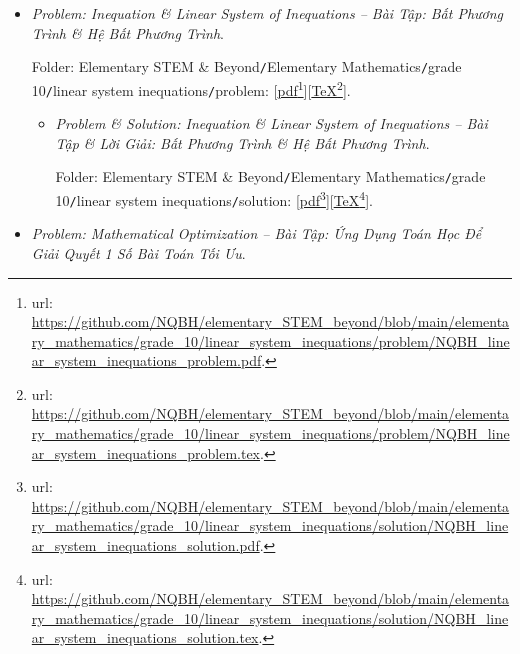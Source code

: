 \documentclass{article}
\begin{document}
\begin{itemize}
	\item {\it Problem: Inequation \& Linear System of Inequations -- Bài Tập: Bất Phương Trình \& Hệ Bất Phương Trình}.

	Folder: {\sf Elementary STEM \& Beyond{\tt/}Elementary Mathematics{\tt/}grade 10{\tt/}linear system inequations{\tt/}problem}: [\href{https://github.com/NQBH/elementary_STEM_beyond/blob/main/elementary_mathematics/grade_10/linear_system_inequations/problem/NQBH_linear_system_inequations_problem.pdf}{pdf}\footnote{{\sc url}: \url{https://github.com/NQBH/elementary_STEM_beyond/blob/main/elementary_mathematics/grade_10/linear_system_inequations/problem/NQBH_linear_system_inequations_problem.pdf}.}][\href{https://github.com/NQBH/elementary_STEM_beyond/blob/main/elementary_mathematics/grade_10/linear_system_inequations/problem/NQBH_linear_system_inequations_problem.tex}{\TeX}\footnote{{\sc url}: \url{https://github.com/NQBH/elementary_STEM_beyond/blob/main/elementary_mathematics/grade_10/linear_system_inequations/problem/NQBH_linear_system_inequations_problem.tex}.}].
	\begin{itemize}
		\item {\it Problem \& Solution: Inequation \& Linear System of Inequations -- Bài Tập \& Lời Giải: Bất Phương Trình \& Hệ Bất Phương Trình}.

		Folder: {\sf Elementary STEM \& Beyond{\tt/}Elementary Mathematics{\tt/}grade 10{\tt/}linear system inequations{\tt/}solution}: [\href{https://github.com/NQBH/elementary_STEM_beyond/blob/main/elementary_mathematics/grade_10/linear_system_inequations/solution/NQBH_linear_system_inequations_solution.pdf}{pdf}\footnote{{\sc url}: \url{https://github.com/NQBH/elementary_STEM_beyond/blob/main/elementary_mathematics/grade_10/linear_system_inequations/solution/NQBH_linear_system_inequations_solution.pdf}.}][\href{https://github.com/NQBH/elementary_STEM_beyond/blob/main/elementary_mathematics/grade_10/linear_system_inequations/solution/NQBH_linear_system_inequations_solution.tex}{\TeX}\footnote{{\sc url}: \url{https://github.com/NQBH/elementary_STEM_beyond/blob/main/elementary_mathematics/grade_10/linear_system_inequations/solution/NQBH_linear_system_inequations_solution.tex}.}].
	\end{itemize}
	\item {\it Problem: Mathematical Optimization -- Bài Tập: Ứng Dụng Toán Học Để Giải Quyết 1 Số Bài Toán Tối Ưu}.


\end{itemize}
\end{document}

